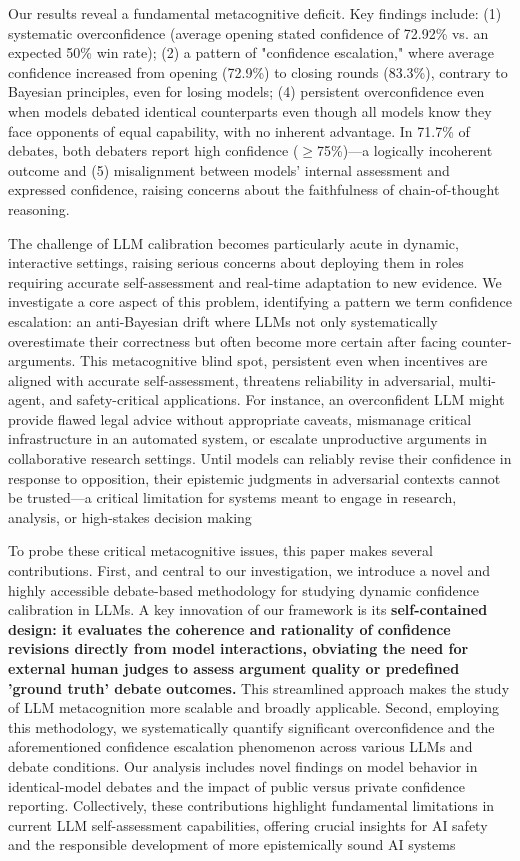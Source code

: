 \documentclass{article}
\begin{document}
Our results reveal a fundamental metacognitive deficit. Key findings include: (1) systematic overconfidence (average opening stated confidence of 72.92\% vs. an expected 50\% win rate); (2) a pattern of "confidence escalation," where average confidence increased from opening (72.9\%) to closing rounds (83.3\%), contrary to Bayesian principles, even for losing models; (4) persistent overconfidence even when models debated identical counterparts even though all models know they face opponents of equal capability, with no inherent advantage. In 71.7\% of debates, both debaters report high confidence ($\ge$75\%)—a logically incoherent outcome and (5) misalignment between models' internal assessment and expressed confidence, raising concerns about the faithfulness of chain-of-thought reasoning.


The challenge of LLM calibration becomes particularly acute in dynamic, interactive settings, raising serious concerns about deploying them in roles requiring accurate self-assessment and real-time adaptation to new evidence. We investigate a core aspect of this problem, identifying a pattern we term confidence escalation: an anti-Bayesian drift where LLMs not only systematically overestimate their correctness but often become more certain after facing counter-arguments. This metacognitive blind spot, persistent even when incentives are aligned with accurate self-assessment, threatens reliability in adversarial, multi-agent, and safety-critical applications. For instance, an overconfident LLM might provide flawed legal advice without appropriate caveats, mismanage critical infrastructure in an automated system, or escalate unproductive arguments in collaborative research settings. Until models can reliably revise their confidence in response to opposition, their epistemic judgments in adversarial contexts cannot be trusted—a critical limitation for systems meant to engage in research, analysis, or high-stakes decision making

To probe these critical metacognitive issues, this paper makes several contributions. First, and central to our investigation, we introduce a novel and highly accessible debate-based methodology for studying dynamic confidence calibration in LLMs. A key innovation of our framework is its \textbf{self-contained design: it evaluates the coherence and rationality of confidence revisions directly from model interactions, obviating the need for external human judges to assess argument quality or predefined 'ground truth' debate outcomes.} This streamlined approach makes the study of LLM metacognition more scalable and broadly applicable. Second, employing this methodology, we systematically quantify significant overconfidence and the aforementioned confidence escalation phenomenon across various LLMs and debate conditions. Our analysis includes novel findings on model behavior in identical-model debates and the impact of public versus private confidence reporting. Collectively, these contributions highlight fundamental limitations in current LLM self-assessment capabilities, offering crucial insights for AI safety and the responsible development of more epistemically sound AI systems
\end{document}

